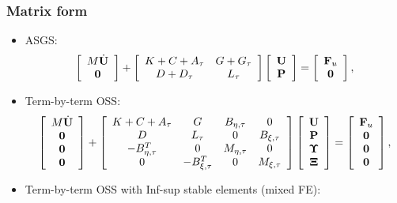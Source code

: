 \begin{frame}
\frametitle{Matrix form}
\begin{itemize}
\item<1-> ASGS:
\begin{equation*}
\left[\begin{array}{c}
M\dot{{\bf U}}\\
\mathbf{0}
\end{array}\right]+\left[\begin{array}{cc}
K+C+A_\tau&G+G_\tau\\
D+D_\tau&L_\tau
\end{array}\right]\left[\begin{array}{c}
{\bf U}\\
{\bf P}
\end{array}\right]=\left[\begin{array}{c}
{\bf F}_u\\
\mathbf{0}
\end{array}\right],
\end{equation*}
\item<2-> Term-by-term OSS:
\begin{equation*}
\left[\begin{array}{c}
M\dot{{\bf U}}\\
\mathbf{0}\\
\mathbf{0}\\
\mathbf{0}
\end{array}\right]+\left[\begin{array}{cccc}
K+C+A_\tau&G&B_{\eta,\tau}&0\\
D&L_\tau&0&B_{\xi,\tau}\\
-B_{\eta,\tau}^T&0&M_{\eta,\tau}&0\\
0&-B_{\xi,\tau}^T&0&M_{\xi,\tau}
\end{array}\right]\left[\begin{array}{c}
{\bf U}\\
{\bf P}\\
\boldsymbol{\Upsilon}\\
{\boldsymbol{\Xi}}
\end{array}\right]=\left[\begin{array}{c}
{\bf F}_u\\
\mathbf{0}\\
\mathbf{0}\\
\mathbf{0}
\end{array}\right],
\end{equation*}
\item<3-> Term-by-term OSS with Inf-sup stable elements (mixed FE):

\end{itemize}
\end{frame}
